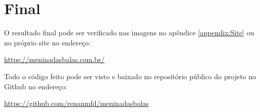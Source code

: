 \section{Final}

O resultado final pode ser verificado nas imagens no apêndice \ref{appendix:Site} ou no próprio site no endereço:

\begin{center}
  \url{https://meninadasbalas.com.br/}
\end{center}

Todo o código feito pode ser visto e baixado no repositório público do projeto no Github no endereço:

\begin{center}
  \url{https://github.com/renanmfd/meninadasbalas}
\end{center}

